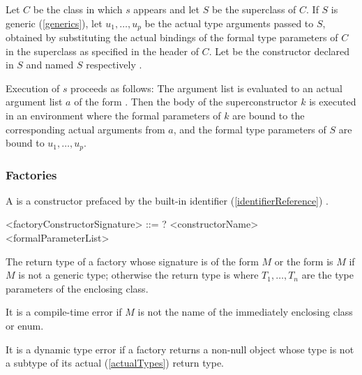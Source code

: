 \documentclass[makeidx]{article}
\begin{document}
\LMHash{}%
%
Let $C$ be the class in which $s$ appears and let $S$ be the superclass of $C$.
If $S$ is generic (\ref{generics}),
let $u_1, \ldots, u_p$ be the actual type arguments passed to $S$,
obtained by substituting the actual bindings 
of the formal type parameters of $C$
in the superclass as specified in the header of $C$.
Let  be the constructor declared in $S$ and named
$S$ respectively .

\LMHash{}%
Execution of $s$ proceeds as follows:
The argument list
is evaluated to an actual argument list $a$ of the form
.
Then the body of the superconstructor $k$ is executed
in an environment where the formal parameters of $k$ are bound to
the corresponding actual arguments from $a$,
and the formal type parameters of $S$ are bound to $u_1, \ldots, u_p$.


\subsubsection{Factories}

\LMHash{}%
A 
is a constructor prefaced by the built-in identifier
(\ref{identifierReference})
\FACTORY.

\begin{grammar}
<factoryConstructorSignature> ::= \gnewline{}
  \CONST? \FACTORY{} <constructorName> <formalParameterList>
\end{grammar}

\LMHash{}%
The return type of a factory whose signature is of
the form \FACTORY{} $M$ or
the form \FACTORY{} 
is $M$ if $M$ is not a generic type;
otherwise the return type is
where $T_1, \ldots, T_n$ are the type parameters of the enclosing class.

\LMHash{}%
It is a compile-time error if $M$ is not the name of
the immediately enclosing class or enum.

\LMHash{}%
It is a dynamic type error if a factory returns a non-null object
whose type is not a subtype of its actual
(\ref{actualTypes})
return type.

\end{document}
